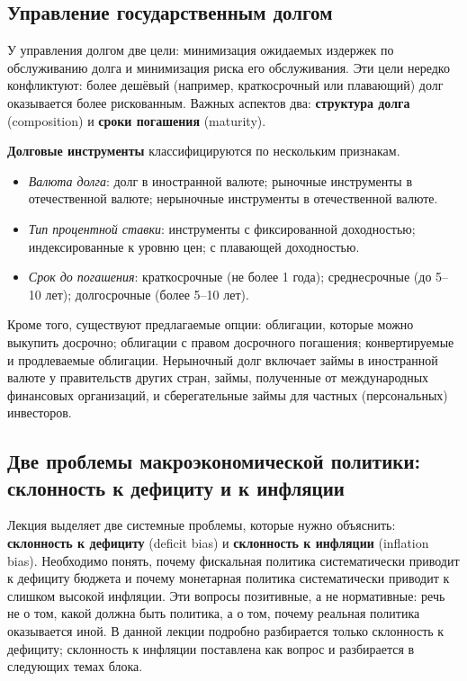 \documentclass[11pt,a4paper]{article}
\begin{document}
\subsection{Управление государственным долгом}

У управления долгом две цели: минимизация ожидаемых издержек по обслуживанию долга и минимизация риска его обслуживания. Эти цели нередко конфликтуют: более дешёвый (например, краткосрочный или плавающий) долг оказывается более рискованным. Важных аспектов два: \textbf{структура долга} (composition) и \textbf{сроки погашения} (maturity).

\textbf{Долговые инструменты} классифицируются по нескольким признакам.
\begin{itemize}[leftmargin=1.5em]
\item \textit{Валюта долга}: долг в иностранной валюте; рыночные инструменты в отечественной валюте; нерыночные инструменты в отечественной валюте.
\item \textit{Тип процентной ставки}: инструменты с фиксированной доходностью; индексированные к уровню цен; с плавающей доходностью.
\item \textit{Срок до погашения}: краткосрочные (не более 1 года); среднесрочные (до 5--10 лет); долгосрочные (более 5--10 лет).
\end{itemize}
Кроме того, существуют предлагаемые опции: облигации, которые можно выкупить досрочно; облигации с правом досрочного погашения; конвертируемые и продлеваемые облигации. Нерыночный долг включает займы в иностранной валюте у правительств других стран, займы, полученные от международных финансовых организаций, и сберегательные займы для частных (персональных) инвесторов.

\subsection{Две проблемы макроэкономической политики: склонность к дефициту и к инфляции}

Лекция выделяет две системные проблемы, которые нужно объяснить: \textbf{склонность к дефициту} (deficit bias) и \textbf{склонность к инфляции} (inflation bias). Необходимо понять, почему фискальная политика систематически приводит к дефициту бюджета и почему монетарная политика систематически приводит к слишком высокой инфляции. Эти вопросы позитивные, а не нормативные: речь не о том, какой должна быть политика, а о том, почему реальная политика оказывается иной. В данной лекции подробно разбирается только склонность к дефициту; склонность к инфляции поставлена как вопрос и разбирается в следующих темах блока.
\end{document}
